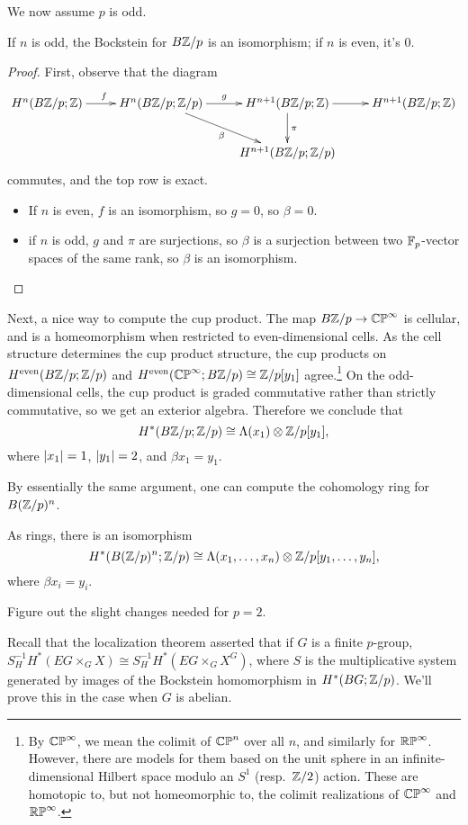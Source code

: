 We now assume $p$ is odd.
\begin{lem}
If $n$ is odd, the Bockstein for $B\mathbb Z/p$ is an isomorphism; if $n$ is even, it's $0$.
\end{lem}
\begin{proof}
First, observe that the diagram
\[\xymatrix{
	H^n(B\Z/p;\Z)\ar[r]^f & H^n(B\Z/p;\Z/p)\ar[r]^g\ar[dr]_\beta & H^{n+1}(B\Z/p;\Z)\ar[d]^\pi\ar[r] &
	H^{n+1}(B\Z/p;\Z)\\
	&& H^{n+1}(B\Z/p;\Z/p)
}\]
commutes, and the top row is exact.
\begin{itemize}
	\item If $n$ is even, $f$ is an isomorphism, so $g = 0$, so $\beta = 0$.
	\item if $n$ is odd, $g$ and $\pi$ are surjections, so $\beta$ is a surjection between two $\mathbb F_p$-vector spaces
	of the same rank, so $\beta$ is an isomorphism.\qedhere
\end{itemize}
\end{proof}
Next, a nice way to compute the cup product. The map $B\mathbb Z/p\to\mathbb{CP}^\infty$ is cellular, and is a homeomorphism when
restricted to even-dimensional cells. As the cell structure determines the cup product structure, the cup products
on $H^{\text{even}}(B\mathbb Z/p;\mathbb Z/p)$ and $H^{\text{even}}(\mathbb{CP}^\infty;B\mathbb Z/p)\cong \mathbb Z/p[y_1]$ agree.\footnote{By
$\mathbb{CP}^\infty$, we mean the colimit of $\mathbb{CP}^n$ over all $n$, and similarly for $\mathbb{RP}^\infty$. However, there are
models for them based on the unit sphere in an infinite-dimensional Hilbert space modulo an $S^1$ (resp.\ $\mathbb Z/2$)
action. These are homotopic to, but not homeomorphic to, the colimit realizations of $\mathbb{CP}^\infty$ and $\mathbb{RP}^\infty$.
} On the odd-dimensional cells, the cup product is graded commutative rather than strictly commutative, so we get
an exterior algebra. Therefore we conclude that
\[H^*(B\mathbb Z/p;\mathbb Z/p)\cong \Lambda(x_1)\otimes \mathbb Z/p[y_1],\]
where $\lvert x_1\rvert = 1$, $\lvert y_1\rvert = 2$, and $\beta x_1 = y_1$.

By essentially the same argument, one can compute the cohomology ring for $B(\mathbb Z/p)^n$.
\begin{prop}
As rings, there is an isomorphism
\[H^*(B(\mathbb Z/p)^n; \mathbb Z/p) \cong \Lambda(x_1,\dotsc,x_n)\otimes\mathbb Z/p[y_1,\dotsc,y_n],\]
where $\beta x_i = y_i$.
\end{prop}
\begin{ex}
Figure out the slight changes needed for $p = 2$.
\end{ex}
Recall that the localization theorem asserted that if $G$ is a finite $p$-group, $S_H^{-1}H^*(EG\times_G
X)\cong S_H^{-1}H^*(EG\times_G X^G)$, where $S$ is the multiplicative system generated by images of the Bockstein
homomorphism in $H^*(BG;\mathbb Z/p)$. We'll prove this in the case when $G$ is abelian.

